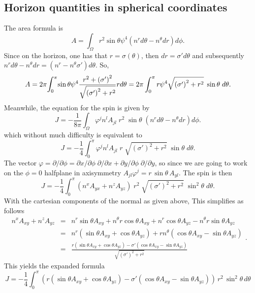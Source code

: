 \documentclass[a4paper,10pt]{article}
\begin{document}
\subsection{Horizon quantities in spherical coordinates}
The area formula is 
\begin{equation}
 A = \int_\Omega{r^2\sin\theta \psi^4 (n^rd\theta - n^\theta dr)d\phi }.
\end{equation}
Since on the horizon, one has that $r = \sigma(\theta)$, then $dr = \sigma'd\theta$ and subsequently $n^rd\theta - n^\theta dr = (n^r - n^\theta\sigma')d\theta$. So,
\begin{equation}
 A = 2\pi\mathlarger{\int}_0^\pi {\sin\theta \psi^4 \frac{r^2 + \left(\sigma'\right)^2}{\sqrt{\left(\sigma'\right)^2 + r^2}}r d\theta} = 2\pi \int_0^\pi {r\psi^4\sqrt{\left(\sigma'\right)^2 + r^2}\;\sin{\theta} \; d\theta}.
\end{equation}
Meanwhile, the equation for the spin is given by
\begin{equation}
 J = -\frac{1}{8\pi}\int_\Omega{\varphi^j n^l A_{jl} \; r^2\;\sin\theta \; (n^rd\theta - n^\theta dr)d\phi}.
\end{equation}
which without much difficulty is equivalent to
\begin{equation}
 J = -\frac{1}{4}\int_0^\pi{\varphi^j n^l A_{jl} \; r \; \sqrt{\left(\sigma'\right)^2 + r^2}\;\sin{\theta} \; d\theta}.
\end{equation}
The vector $\varphi = \partial/\partial\phi = \partial x/\partial\phi\; \partial/\partial x + \partial y/\partial\phi\; \partial/\partial y$, so since we are going to work on the $\phi = 0$ halfplane in axisymmetry $A_{jl}\varphi^j = r\,\sin\theta\,A_{yl}$. The spin is then
\begin{equation}
 J = -\frac{1}{4}\int_0^\pi{ (n^x A_{yx} + n^z A_{yz})\; r^2 \; \sqrt{\left(\sigma'\right)^2 + r^2}\;\sin^2{\theta} \; d\theta}.
\end{equation}
With the cartesian components of the normal as given above, This simplifies as follows
\begin{equation}
\displaystyle{
 \begin{array}{rcl}
  n^xA_{xy} + n^zA_{yz} &=& n^r\sin\theta A_{xy} + n^\theta r \cos\theta A_{xy} + n^r\cos\theta A_{yz} - n^\theta r\sin\theta A_{yz} \\
   &=&n^r\left( \sin\theta A_{xy} + \cos\theta A_{yz} \right) + r n^\theta \left( \cos\theta A_{xy} - \sin\theta A_{yz} \right) \\
   &=&\displaystyle{\frac{r\left( \sin\theta A_{xy} + \cos\theta A_{yz} \right) -\sigma' \left( \cos\theta A_{xy} - \sin\theta A_{yz} \right)}{\sqrt{\left(\sigma'\right)^2 + r^2}}}
 \end{array}.
}
\end{equation}
This yields the expanded formula
\begin{equation}
 J = -\frac{1}{4}\int_0^\pi{\left(r\left( \sin\theta A_{xy} + \cos\theta A_{yz} \right) -\sigma' \left( \cos\theta A_{xy} - \sin\theta A_{yz} \right)\right)\,r^2\,\sin^2\theta\,d\theta}
\end{equation}
\end{document}
